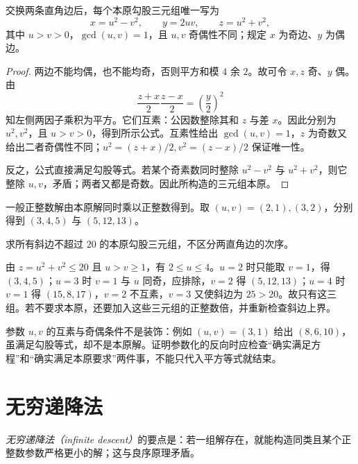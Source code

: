 \begin{theorem}
\label{thm:pythagorean}
交换两条直角边后，每个本原勾股三元组唯一写为
\begin{equation}
 x=u^2-v^2,\qquad y=2uv,\qquad z=u^2+v^2,
 \label{eq:pythagorean-parameters}
\end{equation}
其中 $u>v>0$，$\gcd(u,v)=1$，且 $u,v$ 奇偶性不同；规定 $x$ 为奇边、$y$ 为偶边。
\end{theorem}
\begin{proof}
两边不能均偶，也不能均奇，否则平方和模 $4$ 余 $2$。故可令 $x,z$ 奇、$y$ 偶。由
\[
 \frac{z+x}{2}\frac{z-x}{2}=\left(\frac y2\right)^2
\]
知左侧两因子乘积为平方。它们互素：公因数整除其和 $z$ 与差 $x$。因此分别为 $u^2,v^2$，且 $u>v>0$，得到所示公式。互素性给出 $\gcd(u,v)=1$，$z$ 为奇数又给出二者奇偶性不同；$u^2=(z+x)/2,v^2=(z-x)/2$ 保证唯一性。

反之，公式直接满足勾股等式。若某个奇素数同时整除 $u^2-v^2$ 与 $u^2+v^2$，则它整除 $u,v$，矛盾；两者又都是奇数。因此所构造的三元组本原。
\end{proof}

一般正整数解由本原解同时乘以正整数得到。取 $(u,v)=(2,1),(3,2)$，分别得到 $(3,4,5)$ 与 $(5,12,13)$。

\begin{example}[参数条件怎样保证不漏解]
求所有斜边不超过 $20$ 的本原勾股三元组，不区分两直角边的次序。
\end{example}
\begin{solve}
由 $z=u^2+v^2\le20$ 且 $u>v\ge1$，有 $2\le u\le4$。$u=2$ 时只能取 $v=1$，得 $(3,4,5)$；$u=3$ 时 $v=1$ 与 $u$ 同奇，应排除，$v=2$ 得 $(5,12,13)$；$u=4$ 时 $v=1$ 得 $(15,8,17)$，$v=2$ 不互素，$v=3$ 又使斜边为 $25>20$。故只有这三组。若不要求本原，还要加入这些三元组的正整数倍，并重新检查斜边上界。
\end{solve}

参数 $u,v$ 的互素与奇偶条件不是装饰：例如 $(u,v)=(3,1)$ 给出 $(8,6,10)$，虽满足勾股等式，却不是本原解。证明参数化的反向时应检查“确实满足方程”和“确实满足本原要求”两件事，不能只代入平方等式就结束。

\section{无穷递降法}

\emph{无穷递降法（infinite descent）}的要点是：若一组解存在，就能构造同类且某个正整数参数严格更小的解；这与良序原理矛盾。

